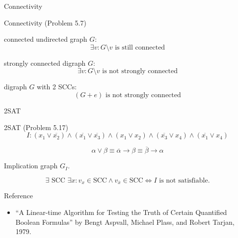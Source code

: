 \begin{frame}{Connectivity}
  \begin{exampleblock}{Connectivity (Problem 5.7)}
	\begin{description}[Example:]
	  \item[Prove:] connected undirected graph $G$: 
		\[
		  \exists v: G \setminus v \text{ is still connected}
		\]
	  \item[Example:] strongly connected digraph $G$:
		\[
		  \exists v: G \setminus v \text{ is not strongly connected}
		\]
	  \item[Example:] digraph $G$ with 2 SCCs:
		\[
		  (G + e) \text{ is not strongly connected}
		\]
	\end{description}
  \end{exampleblock}
\end{frame}
\begin{frame}{2SAT}
  \begin{exampleblock}{2SAT (Problem 5.17)}
	\[
	  I: (x_1 \lor \overline{x_2}) \land (\overline{x_1} \lor \overline{x_3}) \land (x_1 \lor x_2) \land (\overline{x_3} \lor x_4) \land (\overline{x_1} \lor x_4)
	\]
  \end{exampleblock}

  \pause
  \[
	\alpha \lor \beta \equiv \overline{\alpha} \to \beta \equiv \overline{\beta} \to \alpha
  \]

  \pause
  \begin{center}
	Implication graph $G_I$.
  \end{center}

  \pause
  \begin{theorem}
	\[
	  \exists \text{ SCC } \exists x: v_x \in \text{SCC} \land v_{\overline{x}} \in \text{SCC} \iff I \text{ is not satisfiable}.
	\]
  \end{theorem}

  \pause
  \begin{alertblock}{Reference}
	\begin{itemize}
	  \pause
	  \item ``A Linear-time Algorithm for Testing the Truth of Certain Quantified Boolean Formulas'' by Bengt Aspvall, Michael Plass, and Robert Tarjan, 1979.
	\end{itemize}
  \end{alertblock}
\end{frame}
